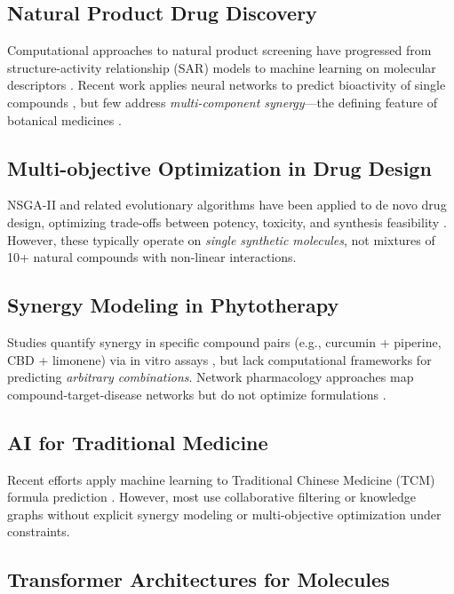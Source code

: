 \documentclass[11pt,a4paper]{article}
\begin{document}
\subsection{Natural Product Drug Discovery}

Computational approaches to natural product screening have progressed from structure-activity relationship (SAR) models to machine learning on molecular descriptors \cite{Chen2018}. Recent work applies neural networks to predict bioactivity of single compounds \cite{Sterling2015}, but few address \textit{multi-component synergy}—the defining feature of botanical medicines \cite{Wagner2011,Williamson2001}.

\subsection{Multi-objective Optimization in Drug Design}

NSGA-II and related evolutionary algorithms have been applied to de novo drug design, optimizing trade-offs between potency, toxicity, and synthesis feasibility \cite{Deb2002,Nicolaou2009}. However, these typically operate on \textit{single synthetic molecules}, not mixtures of 10+ natural compounds with non-linear interactions.

\subsection{Synergy Modeling in Phytotherapy}

Studies quantify synergy in specific compound pairs (e.g., curcumin + piperine, CBD + limonene) via in vitro assays \cite{Russo2011,Ferber2020}, but lack computational frameworks for predicting \textit{arbitrary combinations}. Network pharmacology approaches map compound-target-disease networks but do not optimize formulations \cite{Hopkins2008,Li2014}.

\subsection{AI for Traditional Medicine}

Recent efforts apply machine learning to Traditional Chinese Medicine (TCM) formula prediction \cite{Liang2022,Wang2023TCM}. However, most use collaborative filtering or knowledge graphs without explicit synergy modeling or multi-objective optimization under constraints.

\subsection{Transformer Architectures for Molecules}
\end{document}
